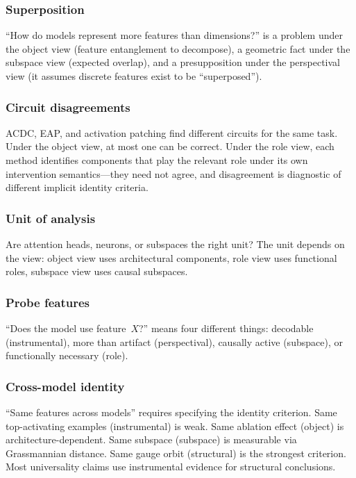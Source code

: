 \documentclass{article}
\begin{document}
\subsubsection{Superposition}
``How do models represent more features than dimensions?'' is a
problem under the object view (feature entanglement to decompose), a
geometric fact under the subspace view (expected overlap), and a
presupposition under the perspectival view (it assumes discrete
features exist to be ``superposed'').

\subsubsection{Circuit disagreements}
ACDC, EAP, and activation patching find different circuits for the same
task.  Under the object view, at most one can be correct.  Under the
role view, each method identifies components that play the relevant
role under its own intervention semantics---they need not agree, and
disagreement is diagnostic of different implicit identity criteria.

\subsubsection{Unit of analysis}
Are attention heads, neurons, or subspaces the right unit?  The unit
depends on the view: object view uses architectural components, role
view uses functional roles, subspace view uses causal subspaces.

\subsubsection{Probe features}
``Does the model use feature~$X$?'' means four different things:
decodable (instrumental), more than artifact (perspectival), causally
active (subspace), or functionally necessary (role).

\subsubsection{Cross-model identity}
``Same features across models'' requires specifying the identity
criterion.  Same top-activating examples (instrumental) is weak.
Same ablation effect (object) is architecture-dependent.  Same
subspace (subspace) is measurable via Grassmannian distance.  Same
gauge orbit (structural) is the strongest criterion.  Most
universality claims use instrumental evidence for structural
conclusions.
\end{document}
